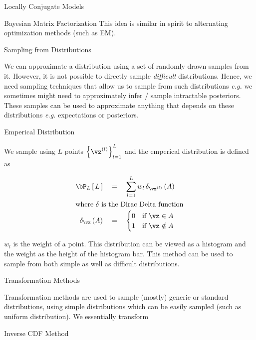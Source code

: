 \documentclass{article}
\begin{document}
\begin{ssection}{Locally Conjugate Models}
\begin{ssubsection}{Bayesian Matrix Factorization}
		This idea is similar in spirit to alternating optimization methods (such as EM). 

	\end{ssubsection}

\end{ssection}

\begin{ssection}{Sampling from Distributions}

	We can approximate a distribution using a set of randomly drawn samples from it. However, it is not possible to directly sample \textit{difficult} distributions. Hence, we need sampling techniques that allow us to sample from such distributions \textit{e.g.} we sometimes might need to approximately infer / sample intractable posteriors. These samples can be used to approximate anything that depends on these distributions \textit{e.g.} expectations or posteriors.

	\begin{sssubsection}{Emperical Distribution}

		We sample using $L$ points $\set{\vz^{(l)}}_{l = 1}^{L}$ and the emperical distribution is defined as

		\begin{align*}
			\prob[L]{L}				&\eq \sum_{l = 1}^{L} w_l \func{\delta_{\vz^{(l)}}}{A} \\
			\shortintertext{where $\delta$ is the Dirac Delta function}
			\func{\delta_{\vz}}{A}	&\eq 
				\begin{cases}
					0	& \mt{if} \vz \in A \\
					1	& \mt{if} \vz \notin A
				\end{cases}
		\end{align*} \br%

		$w_l$ is the weight of a point. This distribution can be viewed as a histogram and the weight as the height of the histogram bar. This method can be used to sample from both simple as well as difficult distributions.

	\end{sssubsection}

	\begin{ssubsection}{Transformation Methods}

		Transformation methods are used to sample (mostly) generic or standard distributions, using simple distributions which can be easily sampled (such as uniform distribution). We essentially transform

		\begin{sssubsection}{Inverse CDF Method}


\end{sssubsection}
\end{ssubsection}
\end{ssection}
\end{document}
